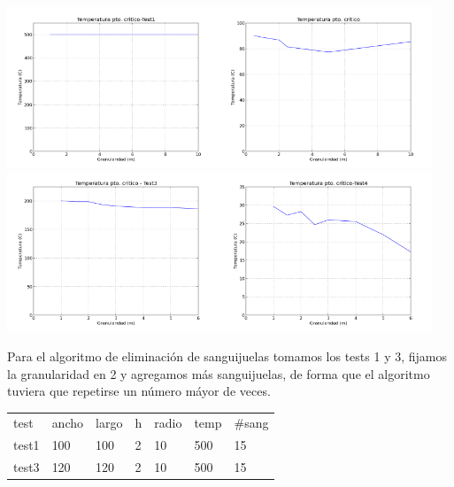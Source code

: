 \documentclass[spanish,a4paper]{article}
\begin{document}
\includegraphics[width=180pt]{temp1.png}\includegraphics[width=180pt]{temp2.png}
\includegraphics[width=180pt]{temp3.png}\includegraphics[width=180pt]{temp4.png}

Para el algoritmo de eliminación de sanguijuelas tomamos los tests 1 y 3, fijamos la granularidad en 2 y agregamos más sanguijuelas, de forma que el algoritmo tuviera que repetirse un número máyor de veces.
  \begin{tabular}{ l l l l l l l}
  test & ancho & largo & h & radio & temp & $\#$sang \\
  test1 & 100 & 100 & 2 & 10 & 500 & 15 \\
  test3 & 120 & 120 & 2 & 10 & 500 & 15 \\
\end{tabular} 
\end{document}

